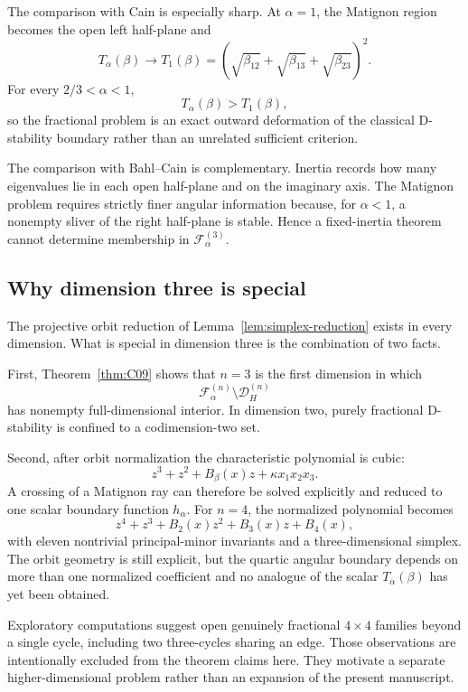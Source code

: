 The comparison with Cain is especially sharp. At \(\alpha=1\), the Matignon region becomes the open left half-plane and
\[
T_\alpha(\beta)\to T_1(\beta)
=
\left(
\sqrt{\beta_{12}}+
\sqrt{\beta_{13}}+
\sqrt{\beta_{23}}
\right)^2.
\]
For every \(2/3<\alpha<1\),
\[
T_\alpha(\beta)>T_1(\beta),
\]
so the fractional problem is an exact outward deformation of the classical D-stability boundary rather than an unrelated sufficient criterion.

The comparison with Bahl--Cain is complementary. Inertia records how many eigenvalues lie in each open half-plane and on the imaginary axis. The Matignon problem requires strictly finer angular information because, for \(\alpha<1\), a nonempty sliver of the right half-plane is stable. Hence a fixed-inertia theorem cannot determine membership in \(\mathcal F_\alpha^{(3)}\).

\subsection{Why dimension three is special}

The projective orbit reduction of Lemma~\ref{lem:simplex-reduction} exists in every dimension. What is special in dimension three is the combination of two facts.

First, Theorem~\ref{thm:C09} shows that \(n=3\) is the first dimension in which
\[
\mathcal F_\alpha^{(n)}
\setminus
\mathcal D_H^{(n)}
\]
has nonempty full-dimensional interior. In dimension two, purely fractional D-stability is confined to a codimension-two set.

Second, after orbit normalization the characteristic polynomial is cubic:
\[
z^3+z^2+B_\beta(x)z+\kappa x_1x_2x_3.
\]
A crossing of a Matignon ray can therefore be solved explicitly and reduced to one scalar boundary function \(h_\alpha\). For \(n=4\), the normalized polynomial becomes
\[
z^4+z^3+B_2(x)z^2+B_3(x)z+B_4(x),
\]
with eleven nontrivial principal-minor invariants and a three-dimensional simplex. The orbit geometry is still explicit, but the quartic angular boundary depends on more than one normalized coefficient and no analogue of the scalar \(T_\alpha(\beta)\) has yet been obtained.

Exploratory computations suggest open genuinely fractional \(4\times4\) families beyond a single cycle, including two three-cycles sharing an edge. Those observations are intentionally excluded from the theorem claims here. They motivate a separate higher-dimensional problem rather than an expansion of the present manuscript.

